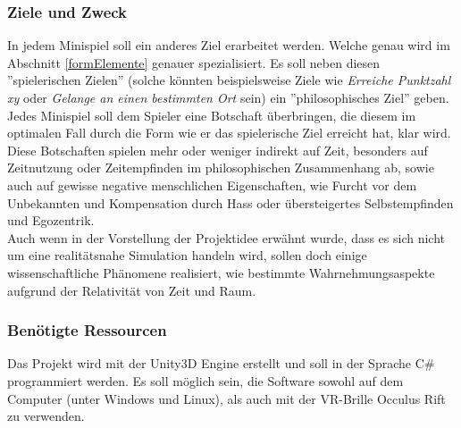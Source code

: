 \documentclass{Ausarbeitung}
\begin{document}
		\subsubsection{Ziele und Zweck}
		\label{ziele}
			In jedem Minispiel soll ein anderes Ziel erarbeitet werden. Welche genau wird im Abschnitt \ref{formElemente} genauer spezialisiert. Es soll neben diesen ''spielerischen Zielen'' (solche könnten beispielsweise Ziele wie \textit{Erreiche Punktzahl xy} oder \textit{Gelange an einen bestimmten Ort} sein) ein ''philosophisches Ziel'' geben. Jedes Minispiel soll dem Spieler eine Botschaft überbringen, die diesem im optimalen Fall durch die Form wie er das spielerische Ziel erreicht hat, klar wird. Diese Botschaften spielen mehr oder weniger indirekt auf Zeit, besonders auf Zeitnutzung oder Zeitempfinden im philosophischen Zusammenhang ab, sowie auch auf gewisse negative menschlichen Eigenschaften, wie Furcht vor dem Unbekannten und Kompensation durch Hass oder übersteigertes Selbstempfinden und Egozentrik. \\ 
			Auch wenn in der Vorstellung der Projektidee erwähnt wurde, dass es sich nicht um eine realitätsnahe Simulation handeln wird, sollen doch einige wissenschaftliche Phänomene realisiert, wie bestimmte Wahrnehmungsaspekte aufgrund der Relativität von Zeit und Raum. 
		\subsubsection{Benötigte Ressourcen}
			Das Projekt wird mit der Unity3D Engine erstellt und soll in der Sprache C\# programmiert werden. Es soll möglich sein, die Software sowohl auf dem Computer (unter Windows und Linux), als auch mit der VR-Brille Occulus Rift zu verwenden. \\
		\label{ressourcen}
	\clearpage
\end{document}
